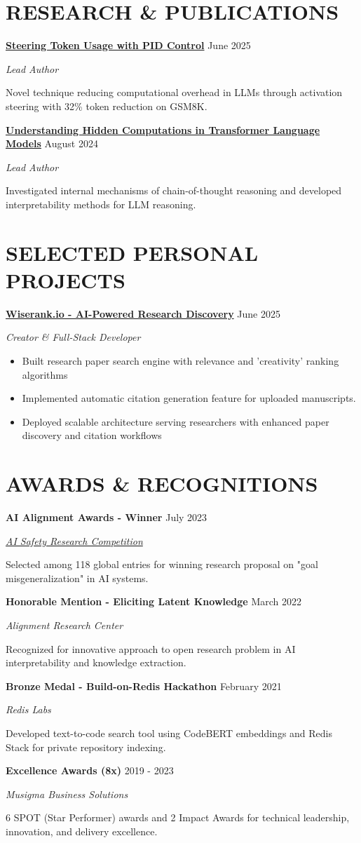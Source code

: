 \documentclass[fontsize=11pt]{article}
\newcommand{\NewPart}[1]{\section*{\uppercase{#1}}}
\newcommand{\ProjectEntry}[4]{
    \noindent \textbf{#1} \hfill {#2} \par
    \noindent \textit{#3} \par
    \noindent \small #4
    \normalsize \par}
\newcommand{\AwardEntry}[4]{
    \noindent \textbf{#1} \hfill {#2} \par
    \noindent \textit{#3} \par
    \noindent \small #4
    \normalsize \par}
\begin{document}
\NewPart{RESEARCH \& PUBLICATIONS}

\ProjectEntry{\href{https://arxiv.org/abs/2506.18831}{Steering Token Usage with PID Control}}{June 2025}{Lead Author}
{Novel technique reducing computational overhead in LLMs through activation steering with 32\% token reduction on GSM8K.}

\ProjectEntry{\href{https://arxiv.org/html/2412.04537}{Understanding Hidden Computations in Transformer Language Models}}{August 2024}{Lead Author}
{Investigated internal mechanisms of chain-of-thought reasoning and developed interpretability methods for LLM reasoning.}

\NewPart{SELECTED PERSONAL PROJECTS}
\ProjectEntry{\href{https://wiserank.io}{Wiserank.io - AI-Powered Research Discovery}}{June 2025}{Creator \& Full-Stack Developer}
{%
\begin{itemize}
\item Built research paper search engine with relevance and 'creativity' ranking algorithms
\item Implemented automatic citation generation feature for uploaded manuscripts.
\item Deployed scalable architecture serving researchers with enhanced paper discovery and citation workflows
\end{itemize}}

\NewPart{AWARDS \& RECOGNITIONS}

\AwardEntry{AI Alignment Awards - Winner}{July 2023}{\href{https://www.lesswrong.com/posts/zFoAAD7dfWdczxoLH/winners-of-ai-alignment-awards-research-contest}{AI Safety Research Competition}}
{Selected among 118 global entries for winning research proposal on "goal misgeneralization" in AI systems.}

\AwardEntry{Honorable Mention - Eliciting Latent Knowledge}{March 2022}{Alignment Research Center}
{Recognized for innovative approach to open research problem in AI interpretability and knowledge extraction.}

\AwardEntry{Bronze Medal - Build-on-Redis Hackathon}{February 2021}{Redis Labs}
{Developed text-to-code search tool using CodeBERT embeddings and Redis Stack for private repository indexing.}

\AwardEntry{Excellence Awards (8x)}{2019 - 2023}{Musigma Business Solutions}
{6 SPOT (Star Performer) awards and 2 Impact Awards for technical leadership, innovation, and delivery excellence.}
\end{document}
